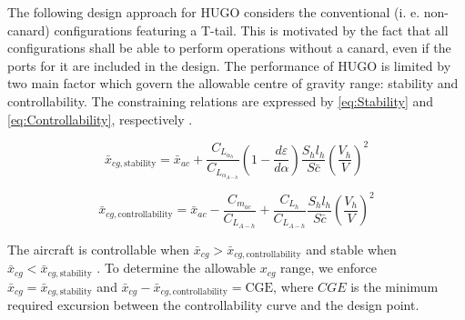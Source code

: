 The following design approach for HUGO considers the conventional (i. e. non-canard) configurations featuring a T-tail. This is motivated by the fact that all configurations shall be able to perform operations without a canard, even if the ports for it are included in the design.
The performance of HUGO is limited by two main factor which govern the allowable centre of gravity range: stability and controllability. The constraining relations are expressed by \autoref{eq:Stability} and \autoref{eq:Controllability}, respectively \cite[p. 309]{torenbeek2013synthesis}.

\begin{equation}
\bar{x}_{cg,\text{stability}} = \bar{x}_{ac} + \frac{C_{L_{\alpha_h}}}{C_{L_{\alpha_{A-h}}}} \left(1 - \frac{d\varepsilon}{d\alpha}\right) \frac{S_h l_h}{S\bar{c}} \left(\frac{V_h}{V}\right)^2
\label{eq:Stability}
\end{equation}

\begin{equation}
\bar{x}_{cg,\text{controllability}} = \bar{x}_{ac} - \frac{C_{m_{ac}}}{C_{L_{A-h}}} + \frac{C_{L_h}}{C_{L_{A-h}}} \frac{S_h l_h}{S\bar{c}} \left(\frac{V_h}{V}\right)^2
\label{eq:Controllability}
\end{equation}

The aircraft is controllable when ${\bar{x}_{cg}}>\bar{x}_{cg,\text{controllability}} $ and stable when ${\bar{x}_{cg}}<\bar{x}_{cg,\text{stability}}$ \cite{torenbeek2013synthesis}. To determine the allowable $x_{cg}$ range, we enforce $\bar{x}_{cg}=\bar{x}_{cg,\text{stability}}$ and $\bar{x}_{cg}-\bar{x}_{cg,\text{controllability}}=\text{CGE}$, where $CGE$ is the minimum required excursion between the controllability curve and the design point. 


